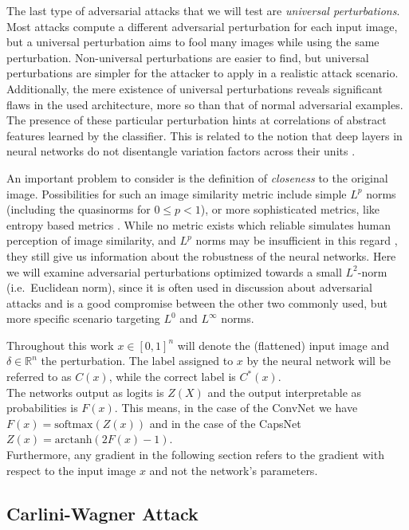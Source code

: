 The last type of adversarial attacks that we will test are \emph{universal perturbations}.
Most attacks compute a different adversarial perturbation for each input image, but a universal perturbation aims to fool many images while using the same perturbation.
Non-universal perturbations are easier to find, but universal perturbations are simpler for the attacker to apply in a realistic attack scenario.
Additionally, the mere existence of universal perturbations reveals significant flaws in the used architecture, more so than that of normal adversarial examples.
The presence of these particular perturbation hints at correlations of abstract features learned by the classifier.
This is related to the notion that deep layers in neural networks do not disentangle variation factors across their units \citep{intriguing}.

An important problem to consider is the definition of \emph{closeness} to the original image. Possibilities for such an image similarity metric include simple $L^p$ norms (including the quasinorms for $0 \leq p < 1$),
or more sophisticated metrics, like entropy based metrics \citep{umbrella}.
While no metric exists which reliable simulates human perception of image similarity, and $L^p$ norms may be insufficient in this regard \citep{lpnorms}, they still give us information about the robustness of the neural networks.
Here we will examine adversarial perturbations optimized towards a small $L^2$-norm (i.e.\ Euclidean norm), since it is often used in discussion about adversarial attacks and is a good compromise between the other two commonly used, but more specific scenario targeting $L^0$ and $L^\infty$ norms.

Throughout this work $x \in [0,1]^n$ will denote the (flattened) input image and $\delta \in \mathbb{R}^n$ the perturbation.
The label assigned to $x$ by the neural network will be referred to as $C(x)$, while the correct label is $C^*(x)$.\\
The networks output as logits is $Z(X)$ and the output interpretable as probabilities is $F(x)$.
This means, in the case of the ConvNet we have $F(x) = \mathrm{softmax}(Z(x))$ and in the case of the CapsNet $Z(x) = \mathrm{arctanh}(2F(x) - 1)$. \\
Furthermore, any gradient in the following section refers to the gradient with respect to the input image $x$ and not the network's parameters.

\subsection{Carlini-Wagner Attack}

